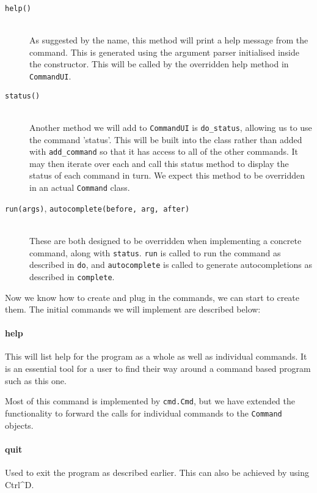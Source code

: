\documentclass[twoside,a4paper]{report}
\begin{document}
\begin{description}
\item[\texttt{help()}] \hfill \\
As suggested by the name, this method will print a help message from the command. This is generated using the argument parser initialised inside
the constructor. This will be called by the overridden help method in \texttt{CommandUI}.

\item[\texttt{status()}] \hfill \\
Another method we will add to \texttt{CommandUI} is \texttt{do\_status}, allowing us to use the command 'status'. This will be built into the
class rather than added with \texttt{add\_command} so that it has access to all of the other commands. It may then iterate over each and call
this status method to display the status of each command in turn. We expect this method to be overridden in an actual \texttt{Command} class.

\item[\texttt{run(args)}, \texttt{autocomplete(before, arg, after)}] \hfill \\
These are both designed to be overridden when implementing a concrete command, along with \texttt{status}. \texttt{run} is called to run the
command as described in \texttt{do}, and \texttt{autocomplete} is called to generate autocompletions as described in \texttt{complete}.
\end{description}

Now we know how to create and plug in the commands, we can start to create them. The initial commands we will implement are described below:

\paragraph{help}

This will list help for the program as a whole as well as individual commands. It is an essential tool for a user to find their way around a
command based program such as this one.

Most of this command is implemented by \texttt{cmd.Cmd}, but we have extended the functionality to forward the calls for individual commands
to the \texttt{Command} objects.

\paragraph{quit}

Used to exit the program as described earlier. This can also be achieved by using Ctrl\^{}D.
\end{document}
